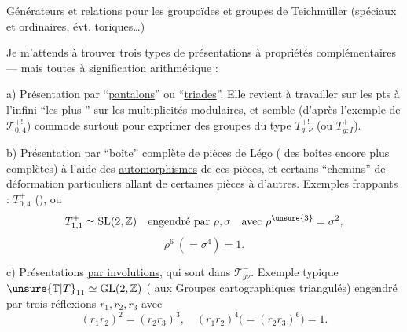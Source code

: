 Générateurs et relations pour les groupoïdes et groupes de Teichmüller (spéciaux et ordinaires, évt. toriques\ldots)

Je m'attends à trouver trois types de présentations à propriétés complémentaires --- mais toutes à signification arithmétique :

a) Présentation par ``\uline{pantalons}'' ou ``\uline{triades}''. Elle revient à travailler sur les pts à l'infini ``les plus '' sur les multiplicités modulaires, et semble (d'après l'exemple de $\mathcal T_{0,4}^{+!}$) commode surtout pour exprimer des groupes du type $T_{g,\nu}^{+!}$ (ou $T_{g;I}^{+}$).

b) Présentation par ``boîte'' complète de pièces de Légo ( des boîtes encore plus complètes) à l'aide des \uline{automorphismes}  de ces pièces, et certains ``chemins'' de déformation particuliers allant de certaines pièces à d'autres. Exemples frappants : $T_{0,4}^+$ (), ou
\[
T_{1,1}^+\simeq\mathrm{SL}(2,\mathbb Z)\quad\text{engendré par }\rho,\sigma\quad\text{avec }\rho^{\unsure{3}}=\sigma^2,
\]
\[
\rho^6\ (=\sigma^4)=1.
\]

c) Présentations \uline{par involutions}, qui sont dans $\mathcal T_{g\nu}^{-}$. Exemple typique $\unsure{\mathbb T|T}_{11}\simeq\mathrm{GL}(2,\mathbb Z)$  ( aux Groupes cartographiques triangulés) engendré par trois réflexions $r_1,r_2,r_3$ avec
\[
(r_1r_2)^2=(r_2r_3)^3,\quad(r_1r_2)^4\bigl(=(r_2r_3)^6\bigr)=1.
\]
